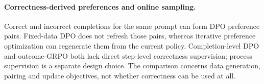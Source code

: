 \paragraph{Correctness-derived preferences and online sampling.}
Correct and incorrect completions for the same prompt can form DPO preference pairs. Fixed-data DPO does not refresh those pairs, whereas iterative preference optimization can regenerate them from the current policy. Completion-level DPO and outcome-GRPO both lack direct step-level correctness supervision; process supervision is a separate design choice. The comparison concerns data generation, pairing and update objectives, not whether correctness can be used at all.
